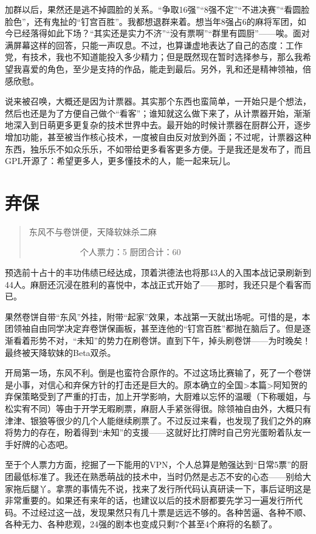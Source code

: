 加群以后，果然还是逃不掉圆脸的关系。“争取16强”“8强不定”“不进决赛”“看圆脸脸色”，还有鬼扯的“钉宫百胜”。我都想退群来着。想当年8强占6的麻将军团，如今已经落得如此下场？“其实还是实力不济”“没有票啊”“群里有圆厨”——唉。面对满屏幕这样的回答，只能一声叹息。不过，也算谦虚地表达了自己的态度：工作党，有技术，我也不知道能投入多少精力；但是既然现在暂时选择参与，那么我希望我喜爱的角色，至少是支持的作品，能走到最后。另外，乳和还是精神领袖，倍感欣慰。

说来被召唤，大概还是因为计票器。其实那个东西也蛮简单，一开始只是个想法，然后也还是为了方便自己做个“看客”；谁知就这么做下来了，从计票器开始，渐渐地深入到日萌更多更复杂的技术世界中去。最开始的时候计票器在厨群公开，逐步增加功能，甚至被当作核心技术，一度被自由反对放到外面；不过呢，计票器这种东西，独乐乐不如众乐乐，不如带给更多看客更多方便。于是我还是发布了，而且GPL开源了：希望更多人，更多懂技术的人，能一起来玩儿。


\section{弃保}
\begin{quote}
东风不与卷饼便，天降软妹杀二麻

　　　　　　个人票力：5 厨团合计：60
\end{quote}

预选前十占十的丰功伟绩已经达成，顶着洪德法也将那43人的入围本战记录刷新到44人。麻厨还沉浸在胜利的喜悦中，本战正式开始了——那时，我还只是个看客而已。

果然卷饼自带“东风”外挂，附带“起家”效果，本战第一天就出场呢。可惜的是，本团领袖自由同学决定弃卷饼保画板，甚至连他的“钉宫百胜”都抛在脑后了。但是逐渐看着形势不对，“未知”的势力在刷卷饼。直到下午，掉头刷卷饼——为时晚矣！最终被天降软妹的Beta双杀。

开局第一场，东风不利。倒是也蛮符合原作的。不过这场比赛输了，死了一个卷饼是小事，对信心和弃保方针的打击还是巨大的。原本确立的全国>本篇>阿知贺的弃保策略受到了严重的打击，加上开学影响，大厨难以忘怀的温暖（下称暖姐，与松实宥不同）等由于开学无暇刷票，麻厨人手紧张得很。除领袖自由外，大概只有津津、银狼等很少的几个人能继续刷票了。不过反过来看，也发现了我们之外的麻将势力的存在，盼着得到“未知”的支援——这就好比打牌时自己穷光蛋盼着队友一手好牌的心态吧。

至于个人票力方面，挖掘了一下能用的VPN，个人总算是勉强达到“日常5票”的厨团最低标准了。我还在熟悉萌战的技术中，当时仍然是忐忑不安的心态——别给大家拖后腿丫。拿票的事情先不说，找来了发行所代码认真研读一下，事后证明这是非常重要的。如果还有来年的话，也建议以后的技术厨都要先学习一遍发行所代码。不过经过这一战，发现果然只有几十票是远远不够的。各种苦逼、各种不顺、各种无力、各种悲观，24强的剧本也变成只剩7个甚至4个麻将的名额了。


